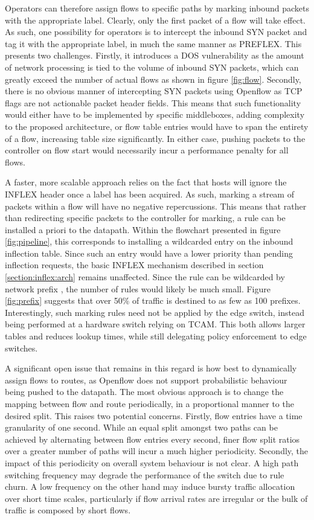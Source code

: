 Operators can therefore assign flows to specific paths by marking inbound packets with the appropriate label.
Clearly, only the first packet of a flow will take effect.
As such, one possibility for operators is to intercept the inbound SYN packet and tag it with the appropriate label, in much the same manner as \ac{PREFLEX}.
This presents two challenges.
Firstly, it introduces a \ac{DOS} vulnerability as the amount of network processing is tied to the volume of inbound SYN packets, which can greatly exceed the number of actual flows as shown in figure \ref{fig:flow}.
Secondly, there is no obvious manner of intercepting SYN packets using Openflow as \ac{TCP} flags are not actionable packet header fields.
This means that such functionality would either have to be implemented by specific middleboxes, adding complexity to the proposed architecture, or flow table entries would have to span the entirety of a flow, increasing table size significantly.
In either case, pushing packets to the controller on flow start would necessarily incur a performance penalty for all flows.

A faster, more scalable approach relies on the fact that hosts will ignore the INFLEX header once a label has been acquired.
As such, marking a stream of packets within a flow will have no negative repercussions.
This means that rather than redirecting specific packets to the controller for marking, a rule can be installed a priori to the datapath.
Within the flowchart presented in figure \ref{fig:pipeline}, this corresponds to installing a wildcarded entry on the inbound inflection table.
Since such an entry would have a lower priority than pending inflection requests, the basic INFLEX mechanism described in section \ref{section:inflex:arch} remains unaffected.
Since the rule can be wildcarded by network prefix , the number of rules would likely be much small. Figure \ref{fig:prefix} suggests that over 50\% of traffic is destined to as few as 100 prefixes.
Interestingly, such marking rules need not be applied by the edge switch, instead being performed at a hardware switch relying on \ac{TCAM}.
This both allows larger tables and reduces lookup times, while still delegating policy enforcement to edge switches.

A significant open issue that remains in this regard is how best to dynamically assign flows to routes, as Openflow does not support probabilistic behaviour being pushed to the datapath.
The most obvious approach is to change the mapping between flow and route periodically, in a proportional manner to the desired split.
This raises two potential concerns.
Firstly, flow entries have a time granularity of one second.
While an equal split amongst two paths can be achieved by alternating between flow entries every second, finer flow split ratios over a greater number of paths will incur a much higher periodicity.
Secondly, the impact of this periodicity on overall system behaviour is not clear.
A high path switching frequency may degrade the performance of the switch due to rule churn.
A low frequency on the other hand may induce bursty traffic allocation over short time scales, particularly if flow arrival rates are irregular or the bulk of traffic is composed by short flows.

